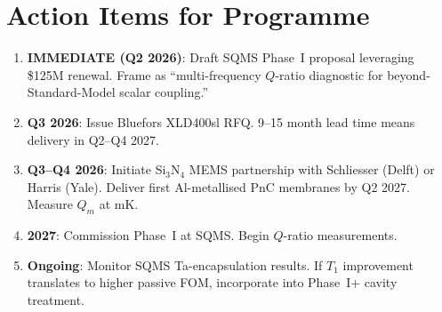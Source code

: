 \documentclass[11pt]{article}
\theoremstyle{definition}
\theoremstyle{remark}
\begin{document}
\section{Action Items for Programme}
\label{sec:actions}

\begin{enumerate}
\item \textbf{IMMEDIATE (Q2 2026)}: Draft SQMS Phase~I proposal
  leveraging \$125M renewal. Frame as ``multi-frequency $Q$-ratio
  diagnostic for beyond-Standard-Model scalar coupling.''

\item \textbf{Q3 2026}: Issue Bluefors XLD400sl RFQ.
  9--15 month lead time means delivery in Q2--Q4 2027.

\item \textbf{Q3--Q4 2026}: Initiate Si$_3$N$_4$ MEMS partnership
  with Schliesser (Delft) or Harris (Yale). Deliver first
  Al-metallised PnC membranes by Q2 2027. Measure $Q_m$ at mK.

\item \textbf{2027}: Commission Phase~I at SQMS. Begin $Q$-ratio
  measurements.

\item \textbf{Ongoing}: Monitor SQMS Ta-encapsulation results.
  If $T_1$ improvement translates to higher passive FOM,
  incorporate into Phase~I+ cavity treatment.
\end{enumerate}
\end{document}
